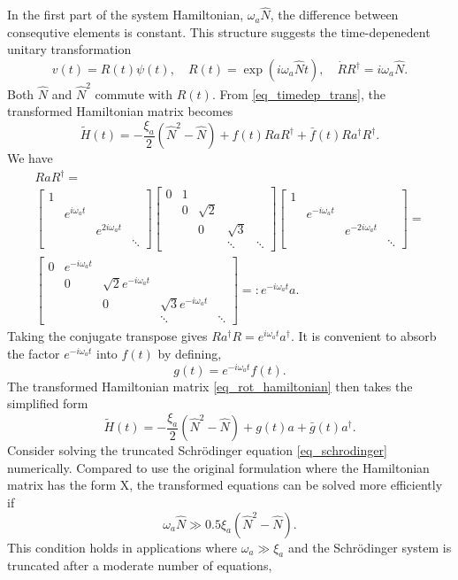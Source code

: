 \documentclass[11pt]{article}
\begin{document}
In the first part of the system Hamiltonian, $\omega_a \hat{N}$, the difference between consequtive
elements is constant. This structure suggests the time-depenedent unitary transformation
\[
v(t) = R(t)\psi(t),\quad R(t) = \exp(i\omega_a \hat{N} t),\quad \dot{R}R^\dag = i\omega_a \hat{N}.
\]
Both $\hat{N}$ and $\hat{N}^2$ commute with $R(t)$. From \eqref{eq_timedep_trans}, the transformed
Hamiltonian matrix becomes
\begin{equation}\label{eq_rot_hamiltonian}
\widetilde{H}(t) = -\frac{\xi_a}{2} \left(\hat{N}^2 - \hat{N}\right) + f(t) R a R^\dag + \bar{f}(t) R a^\dag R^\dag.
\end{equation}
We have
\begin{multline*}
  R a R^\dag =\\
\begin{bmatrix}
  1 & & & \\
  & e^{i\omega_a t} & & \\
  & &  e^{2i\omega_a t} & \\
  & & & \ddots
\end{bmatrix}
\begin{bmatrix}
0 & 1 & & &\\
 & 0 & \sqrt{2} & &\\
&  & 0 & \sqrt{3} &\\
& &  & \ddots & \ddots
\end{bmatrix}
\begin{bmatrix}
  1 & & & \\
  & e^{-i\omega_a t} & & \\
  & &  e^{-2i\omega_a t} & \\
  & & & \ddots
\end{bmatrix} = \\
%
\begin{bmatrix}
0 & e^{-i\omega_a t} & & &\\
 & 0 & \sqrt{2} e^{-i\omega_a t}& &\\
&  & 0 & \sqrt{3} e^{-i\omega_a t}  &\\
& &  & \ddots & \ddots
\end{bmatrix} =: e^{-i\omega_a t} a.
%
\end{multline*}
Taking the conjugate transpose gives $R a^\dag R = e^{i\omega_a t} a^\dag$. It is convenient to absorb the factor
$e^{-i\omega_a t}$ into $f(t)$ by defining,
\[
g(t) = e^{-i\omega_a t} f(t).
\]
The transformed Hamiltonian matrix \eqref{eq_rot_hamiltonian} then takes the simplified form
\[
\widetilde{H}(t) = -\frac{\xi_a}{2} \left(\hat{N}^2 - \hat{N}\right) + g(t) a + \bar{g}(t) a^\dag.
\]
Consider solving the truncated Schr\"odinger equation \eqref{eq_schrodinger} numerically. Compared
to use the original formulation where the Hamiltonian matrix has the form X, the transformed
equations can be solved more efficiently if
\[
\omega_a \hat{N} \gg 0.5\xi_a (\hat{N}^2 - \hat{N}).
\]
This condition holds in applications where $\omega_a \gg \xi_a$ and the Schr\"odinger system is truncated after a moderate
number of equations,
\end{document}
